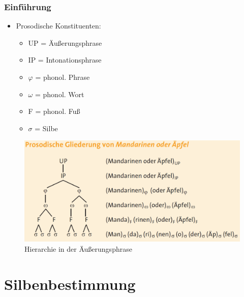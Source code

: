 \begin{frame}
\frametitle{Einführung}


\begin{itemize}
	\item Prosodische Konstituenten:
	\begin{multicols}{2}
	\begin{itemize}
		\item UP = Äußerungsphrase
		\item IP = Intonationsphrase
		\item $\varphi$ = phonol. Phrase
\columnbreak
		\item $\omega$ = phonol. Wort
		\item F = phonol. Fuß
		\item \alert{$\sigma$ = Silbe}
	\end{itemize}
	\end{multicols}
\end{itemize}

\begin{figure}[b]
	\centering
	
	\includegraphics[scale=0.28]{material/03bHierarchieUP}
	\caption{Hierarchie in der Äußerungsphrase \citep[8]{Fuhrhop&Co13a}}
\end{figure}


\end{frame}



\section{Silbenbestimmung}

